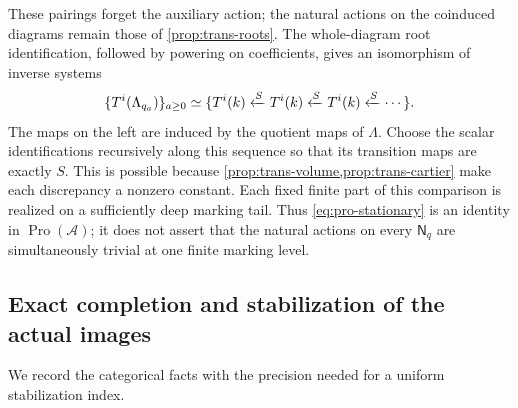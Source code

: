 These pairings forget the auxiliary action; the natural actions on the
coinduced diagrams remain those of \cref{prop:trans-roots}. The
whole-diagram root identification, followed by powering on
coefficients, gives an isomorphism of inverse systems
\begin{equation}
\label{eq:pro-stationary}
 \{T^i(\Lambda_{q_a})\}_{a\geq0}
 \simeq
 \{T^i(k)\xleftarrow{S}T^i(k)
                    \xleftarrow{S}T^i(k)\xleftarrow{S}\cdots\}.
\end{equation}
The maps on the left are induced by the quotient maps of $\Lambda$.
Choose the scalar identifications recursively along this sequence so
that its transition maps are exactly $S$.  This is possible because
\cref{prop:trans-volume,prop:trans-cartier} make each discrepancy a
nonzero constant.  Each fixed finite part of this comparison is
realized on a sufficiently deep marking tail.  Thus
\cref{eq:pro-stationary} is an identity in
$\operatorname{Pro}(\mathcal A)$; it does not assert that the natural
actions on every $\mathsf N_q$ are simultaneously trivial at one
finite marking level.

\subsection{Exact completion and stabilization of the actual images}

We record the categorical facts with the precision needed for a
uniform stabilization index.


